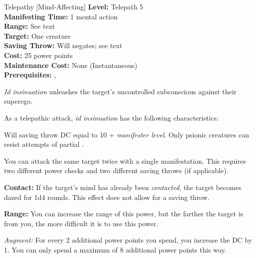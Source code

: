 {Telepathy [Mind-Affecting]}
{
	\textbf{Level:}
	Telepath 5\\
	\textbf{Manifesting Time:}
	1 mental action\\
	\textbf{Range:}
	See text\\
	\textbf{Target:}
	One creature\\
	\textbf{Saving Throw:}
	Will negates; see text\\
	\textbf{Cost:}
	25 power points\\
	\textbf{Maintenance Cost:}
	None (Instantaneous)\\
	\textbf{Prerequisites:}
	, \\
}
{
	\emph{Id insinuation} unleashes the target's uncontrolled subconscious against their superego.

	As a telepathic attack, \emph{id insinuation} has the following characteristics:
	\begin{itemize*}
		\item Will saving throw DC equal to 10 + \textit{manifester level}. Only psionic creatures can resist attempts of partial .
		\item You can attack the same target twice with a single manifestation. This requires two different power checks and two different saving throws (if applicable).
	\end{itemize*}

	\textbf{Contact:} If the target's mind has already been \emph{contacted}, the target becomes dazed for 1d4 rounds. This effect does not allow for a saving throw.
	
	\textbf{Range:} You can increase the range of this power, but the farther the target is from you, the more difficult it is to use this power.


	\textit{Augment:} For every 2 additional power points you spend, you increase the DC by 1. You can only spend a maximum of 8 additional power points this way.
}
